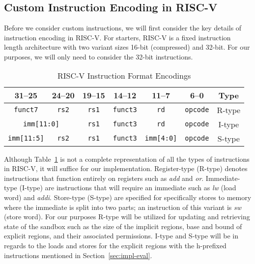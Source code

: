\documentclass[conference,compsoc]{IEEEtran}
\begin{document}
\subsection{Custom Instruction Encoding in RISC-V}
Before we consider custom instructions, we will first consider the key details of instruction encoding in RISC-V.
For starters, RISC-V is a fixed instruction length architecture with two variant sizes 16-bit (compressed) and 32-bit.
For our purposes, we will only need to consider the 32-bit instructions.

\begin{table}[H]
  \centering
  \caption{RISC-V Instruction Format Encodings}
  {\fontsize{6.5}{7.5}\selectfont
  \begin{tabular}{|c|c|c|c|c|c|c|}
  \hline
  \textbf{31--25} & \textbf{24--20} & \textbf{19--15} & \textbf{14--12} & \textbf{11--7} & \textbf{6--0} & \textbf{Type} \\
  \hline
  \texttt{funct7} & \texttt{rs2} & \texttt{rs1} & \texttt{funct3} & \texttt{rd} & \texttt{opcode} & R-type \\
  \hline
  \multicolumn{2}{|c|}{\texttt{imm[11:0]}} & \texttt{rs1} & \texttt{funct3} & \texttt{rd} & \texttt{opcode} & I-type \\
  \hline
  \texttt{imm[11:5]} & \texttt{rs2} & \texttt{rs1} & \texttt{funct3} & \texttt{imm[4:0]} & \texttt{opcode} & S-type \\
  \hline
  \end{tabular} 
  }
  \label{tab:encoding-summary}
\end{table}

Although Table~\ref{tab:encoding-summary} is not a complete representation of all the types of instructions in RISC-V, it will suffice for our implementation.
Register-type (R-type) denotes instructions that function entirely on registers such as \textit{add} and \textit{or}.
Immediate-type (I-type) are instructions that will require an immediate such as \textit{lw} (load word) and \textit{addi}.
Store-type (S-type) are specified for specifically stores to memory where the immediate is split into two parts; an instruction of this variant is \textit{sw} (store word).
For our purposes R-type will be utilized for updating and retrieving state of the sandbox such as the size of the implicit regions, base and bound of explicit regions, and their associated permissions.
I-type and S-type will be in regards to the loads and stores for the explicit regions with the h-prefixed instructions mentioned in Section~\ref{sec:impl-eval}.
\end{document}
